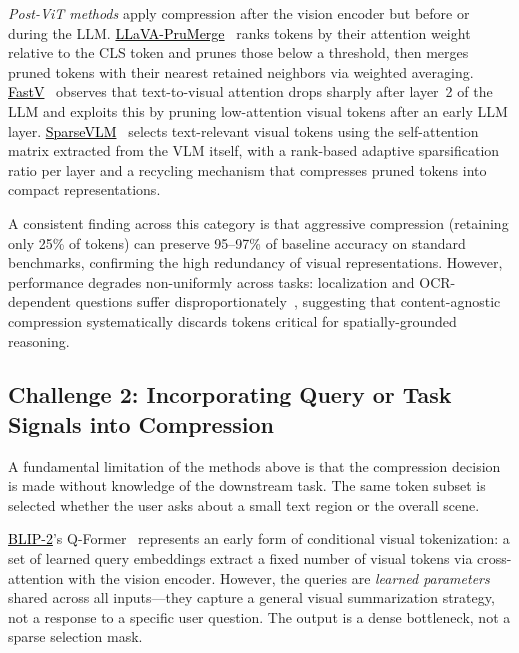 \documentclass[11pt,twocolumn]{article}
\newcommand{\paperhref}[2]{\href{#1}{\textcolor{black}{#2}}}
\begin{document}
\emph{Post-ViT methods} apply compression after the vision encoder but before or during the LLM. \paperhref{https://arxiv.org/abs/2403.15388}{LLaVA-PruMerge}~\cite{shang2024llava} ranks tokens by their attention weight relative to the CLS token and prunes those below a threshold, then merges pruned tokens with their nearest retained neighbors via weighted averaging. \paperhref{https://arxiv.org/abs/2410.04417}{FastV}~\cite{chen2024fastv} observes that text-to-visual attention drops sharply after layer~2 of the LLM and exploits this by pruning low-attention visual tokens after an early LLM layer. \paperhref{https://arxiv.org/abs/2504.00654}{SparseVLM}~\cite{zhang2025sparsevlm} selects text-relevant visual tokens using the self-attention matrix extracted from the VLM itself, with a rank-based adaptive sparsification ratio per layer and a recycling mechanism that compresses pruned tokens into compact representations.

A consistent finding across this category is that aggressive compression (retaining only 25\% of tokens) can preserve 95--97\% of baseline accuracy on standard benchmarks, confirming the high redundancy of visual representations. However, performance degrades non-uniformly across tasks: localization and OCR-dependent questions suffer disproportionately~\cite{chen2024fastv}, suggesting that content-agnostic compression systematically discards tokens critical for spatially-grounded reasoning.

\subsection{Challenge 2: Incorporating Query or Task Signals into Compression}

A fundamental limitation of the methods above is that the compression decision is made without knowledge of the downstream task. The same token subset is selected whether the user asks about a small text region or the overall scene.

\paperhref{https://arxiv.org/abs/2301.12597}{BLIP-2}'s Q-Former~\cite{li2023blip2} represents an early form of conditional visual tokenization: a set of learned query embeddings extract a fixed number of visual tokens via cross-attention with the vision encoder. However, the queries are \emph{learned parameters} shared across all inputs---they capture a general visual summarization strategy, not a response to a specific user question. The output is a dense bottleneck, not a sparse selection mask.
\end{document}
